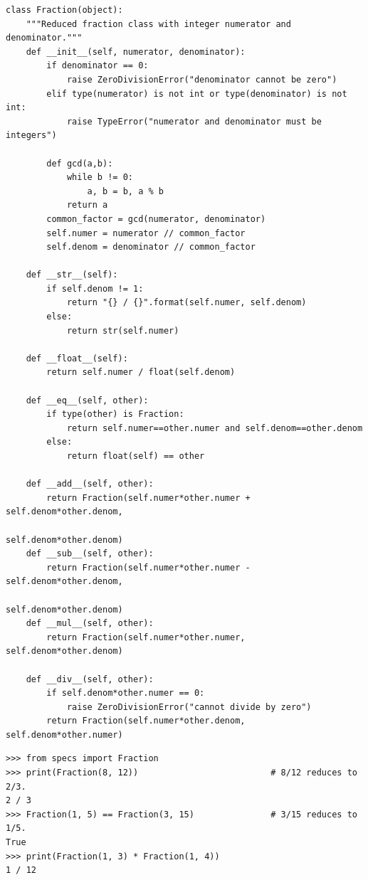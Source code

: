\begin{lstlisting}
class Fraction(object):
    """Reduced fraction class with integer numerator and denominator."""
    def __init__(self, numerator, denominator):
        if denominator == 0:
            raise ZeroDivisionError("denominator cannot be zero")
        elif type(numerator) is not int or type(denominator) is not int:
            raise TypeError("numerator and denominator must be integers")

        def gcd(a,b):
            while b != 0:
                a, b = b, a % b
            return a
        common_factor = gcd(numerator, denominator)
        self.numer = numerator // common_factor
        self.denom = denominator // common_factor

    def __str__(self):
        if self.denom != 1:
            return "{} / {}".format(self.numer, self.denom)
        else:
            return str(self.numer)

    def __float__(self):
        return self.numer / float(self.denom)

    def __eq__(self, other):
        if type(other) is Fraction:
            return self.numer==other.numer and self.denom==other.denom
        else:
            return float(self) == other

    def __add__(self, other):
        return Fraction(self.numer*other.numer + self.denom*other.denom,
                                                        self.denom*other.denom)
    def __sub__(self, other):
        return Fraction(self.numer*other.numer - self.denom*other.denom,
                                                        self.denom*other.denom)
    def __mul__(self, other):
        return Fraction(self.numer*other.numer, self.denom*other.denom)

    def __div__(self, other):
        if self.denom*other.numer == 0:
            raise ZeroDivisionError("cannot divide by zero")
        return Fraction(self.numer*other.denom, self.denom*other.numer)
\end{lstlisting}


\begin{lstlisting}
>>> from specs import Fraction
>>> print(Fraction(8, 12))                          # 8/12 reduces to 2/3.
2 / 3
>>> Fraction(1, 5) == Fraction(3, 15)               # 3/15 reduces to 1/5.
True
>>> print(Fraction(1, 3) * Fraction(1, 4))
1 / 12
\end{lstlisting}

